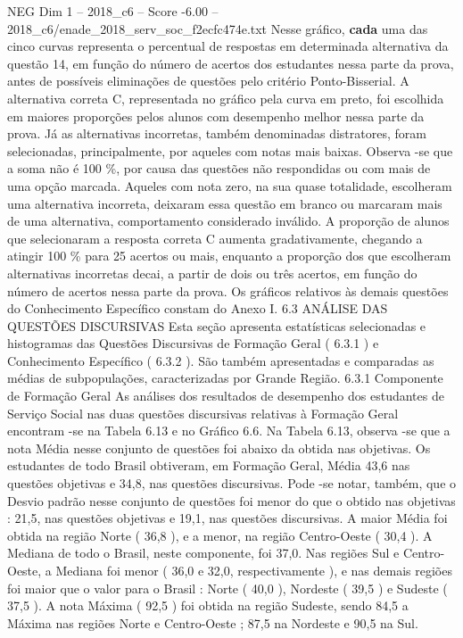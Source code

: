 \begin{textsample}{NEG Dim 1 – 2018\_c6 – Score -6.00 – 2018\_c6/enade\_2018\_serv\_soc\_f2ecfc474e.txt}
Nesse gráfico, \textbf{cada} uma das cinco curvas representa o percentual de respostas em determinada alternativa da questão 14, em função do número de acertos dos estudantes nessa parte da prova, antes de possíveis eliminações de questões pelo critério Ponto-Bisserial.
A alternativa correta C, representada no gráfico pela curva em preto, foi escolhida em maiores proporções pelos alunos com desempenho melhor nessa parte da prova.
Já as alternativas incorretas, também denominadas distratores, foram selecionadas, principalmente, por aqueles com notas mais baixas.
Observa -se que a soma não é 100 \%, por causa das questões não respondidas ou com mais de uma opção marcada.
Aqueles com nota zero, na sua quase totalidade, escolheram uma alternativa incorreta, deixaram essa questão em branco ou marcaram mais de uma alternativa, comportamento considerado inválido.
A proporção de alunos que selecionaram a resposta correta C aumenta gradativamente, chegando a atingir 100 \% para 25 acertos ou mais, enquanto a proporção dos que escolheram alternativas incorretas decai, a partir de dois ou três acertos, em função do número de acertos nessa parte da prova.
Os gráficos relativos às demais questões do Conhecimento Específico constam do Anexo I. 6.3 ANÁLISE DAS QUESTÕES DISCURSIVAS Esta seção apresenta estatísticas selecionadas e histogramas das Questões Discursivas de Formação Geral ( 6.3.1 ) e Conhecimento Específico ( 6.3.2 ).
São também apresentadas e comparadas as médias de subpopulações, caracterizadas por Grande Região. 6.3.1 Componente de Formação Geral As análises dos resultados de desempenho dos estudantes de Serviço Social nas duas questões discursivas relativas à Formação Geral encontram -se na Tabela 6.13 e no Gráfico 6.6.
Na Tabela 6.13, observa -se que a nota Média nesse conjunto de questões foi abaixo da obtida nas objetivas.
Os estudantes de todo Brasil obtiveram, em Formação Geral, Média 43,6 nas questões objetivas e 34,8, nas questões discursivas.
Pode -se notar, também, que o Desvio padrão nesse conjunto de questões foi menor do que o obtido nas objetivas : 21,5, nas questões objetivas e 19,1, nas questões discursivas.
A maior Média foi obtida na região Norte ( 36,8 ), e a menor, na região Centro-Oeste ( 30,4 ).
A Mediana de todo o Brasil, neste componente, foi 37,0.
Nas regiões Sul e Centro-Oeste, a Mediana foi menor ( 36,0 e 32,0, respectivamente ), e nas demais regiões foi maior que o valor para o Brasil : Norte ( 40,0 ), Nordeste ( 39,5 ) e Sudeste ( 37,5 ).
A nota Máxima ( 92,5 ) foi obtida na região Sudeste, sendo 84,5 a Máxima nas regiões Norte e Centro-Oeste ; 87,5 na Nordeste e 90,5 na Sul.

\end{textsample}
